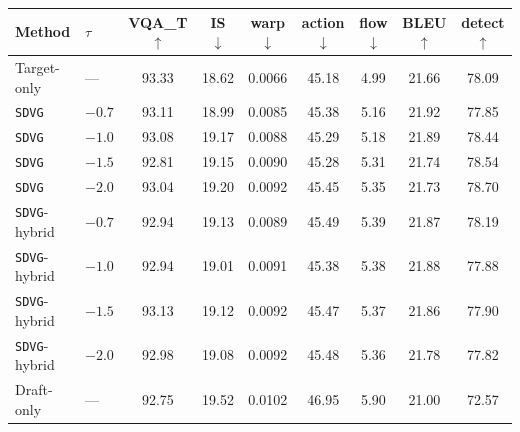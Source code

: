 \documentclass{article} %
\begin{document}
\begin{table}[t]
  \vspace{7pt}
  \small
  \begin{tabular*}{0.97\linewidth}{@{\extracolsep{\fill}}llccccccc}
    \toprule
    Method & $\tau$ & VQA\_T $\uparrow$ & IS $\downarrow$ & warp $\downarrow$
           & action $\downarrow$ & flow $\downarrow$
           & BLEU $\uparrow$ & detect $\uparrow$ \\
    \midrule
    Target-only        & ---    & 93.33 & 18.62 & 0.0066 & 45.18 & 4.99 & 21.66 & 78.09 \\
    \midrule
    \texttt{SDVG}      & $-0.7$ & 93.11 & 18.99 & 0.0085 & 45.38 & 5.16 & 21.92 & 77.85 \\
    \texttt{SDVG}      & $-1.0$ & 93.08 & 19.17 & 0.0088 & 45.29 & 5.18 & 21.89 & 78.44 \\
    \texttt{SDVG}      & $-1.5$ & 92.81 & 19.15 & 0.0090 & 45.28 & 5.31 & 21.74 & 78.54 \\
    \texttt{SDVG}      & $-2.0$ & 93.04 & 19.20 & 0.0092 & 45.45 & 5.35 & 21.73 & 78.70 \\
    \midrule
    \texttt{SDVG}-hybrid & $-0.7$ & 92.94 & 19.13 & 0.0089 & 45.49 & 5.39 & 21.87 & 78.19 \\
    \texttt{SDVG}-hybrid & $-1.0$ & 92.94 & 19.01 & 0.0091 & 45.38 & 5.38 & 21.88 & 77.88 \\
    \texttt{SDVG}-hybrid & $-1.5$ & 93.13 & 19.12 & 0.0092 & 45.47 & 5.37 & 21.86 & 77.90 \\
    \texttt{SDVG}-hybrid & $-2.0$ & 92.98 & 19.08 & 0.0092 & 45.48 & 5.36 & 21.78 & 77.82 \\
    \midrule
    Draft-only         & ---    & 92.75 & 19.52 & 0.0102 & 46.95 & 5.90 & 21.00 & 72.57 \\
    \bottomrule
  \end{tabular*}
\end{table}

\end{document}
